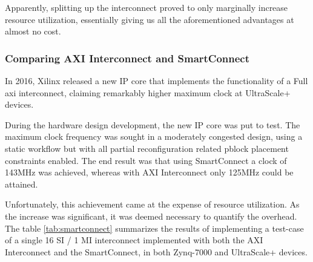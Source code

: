 Apparently, splitting up the interconnect proved to only marginally increase
resource utilization, essentially giving us all the aforementioned advantages at almost no cost.


\subsubsection{Comparing AXI Interconnect and SmartConnect}

In 2016, Xilinx released a new IP core that implements 
the functionality of a Full \gls{axi} interconnect,
claiming remarkably higher maximum clock at UltraScale+ devices.

During the hardware design development, the new IP core was put to test.
The maximum clock frequency was sought in a moderately congested design,
using a static workflow but with all partial reconfiguration related 
\gls{pblock} placement constraints enabled. The end result was that
using SmartConnect a clock of 143MHz was achieved, whereas with
AXI Interconnect only 125MHz could be attained.

Unfortunately, this achievement came at the expense of resource utilization.
As the increase was significant, it was deemed necessary to quantify the overhead.
The table \ref{tab:smartconnect} summarizes the results of implementing 
a test-case of a single 16 SI / 1 MI interconnect implemented with both the 
AXI Interconnect and the SmartConnect, in both Zynq-7000 and UltraScale+ devices.


